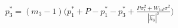 \documentclass[preview]{standalone}
\begin{document}
\begin{align*}
p_3^\ast = \left(m_3 - 1\right) \bigg( p_1^\ast + P - p_1^\ast - p_3^\ast + \frac{P \sigma_\epsilon^2 + W_{tot} \sigma^2}{\left|\hat{h_3}\right|^2} \bigg)
\end{align*}
\end{document}
